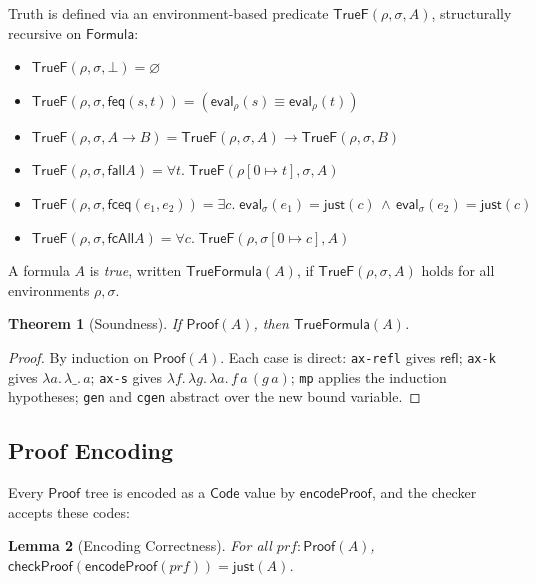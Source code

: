 \documentclass[11pt]{article}
\newtheorem{theorem}{Theorem}[section]
\newtheorem{lemma}[theorem]{Lemma}
\newcommand{\Code}{\mathsf{Code}}
\newcommand{\Formula}{\mathsf{Formula}}
\newcommand{\Proof}{\mathsf{Proof}}
\newcommand{\checkProof}{\mathsf{checkProof}}
\newcommand{\fbot}{\bot}
\newcommand{\feq}{\mathsf{feq}}
\newcommand{\fall}{\mathsf{fall}}
\newcommand{\fceq}{\mathsf{fceq}}
\newcommand{\fcAll}{\mathsf{fcAll}}
\newcommand{\TrueF}{\mathsf{TrueF}}
\newcommand{\TrueFormula}{\mathsf{TrueFormula}}
\begin{document}
Truth is defined via an environment-based predicate
$\TrueF(\rho, \sigma, A)$, structurally recursive on $\Formula$:
\begin{itemize}[nosep]
  \item $\TrueF(\rho, \sigma, \fbot) = \varnothing$
  \item $\TrueF(\rho, \sigma, \feq(s,t)) = (\mathsf{eval}_\rho(s) \equiv \mathsf{eval}_\rho(t))$
  \item $\TrueF(\rho, \sigma, A \to B) = \TrueF(\rho,\sigma,A) \to \TrueF(\rho,\sigma,B)$
  \item $\TrueF(\rho, \sigma, \fall A) = \forall t.\; \TrueF(\rho[0 \mapsto t], \sigma, A)$
  \item $\TrueF(\rho, \sigma, \fceq(e_1,e_2)) = \exists c.\; \mathsf{eval}_\sigma(e_1) = \mathsf{just}(c) \,\wedge\, \mathsf{eval}_\sigma(e_2) = \mathsf{just}(c)$
  \item $\TrueF(\rho, \sigma, \fcAll A) = \forall c.\; \TrueF(\rho, \sigma[0 \mapsto c], A)$
\end{itemize}
A formula $A$ is \emph{true}, written $\TrueFormula(A)$, if $\TrueF(\rho, \sigma, A)$
holds for all environments $\rho, \sigma$.

\begin{theorem}[Soundness]
  \label{thm:soundness}
  If $\Proof(A)$, then $\TrueFormula(A)$.
\end{theorem}

\begin{proof}
  By induction on $\Proof(A)$. Each case is direct:
  \texttt{ax-refl} gives $\mathsf{refl}$;
  \texttt{ax-k} gives $\lambda a.\, \lambda \_.\, a$;
  \texttt{ax-s} gives $\lambda f.\, \lambda g.\, \lambda a.\, f\,a\,(g\,a)$;
  \texttt{mp} applies the induction hypotheses;
  \texttt{gen} and \texttt{cgen} abstract over the new bound variable.
\end{proof}

\subsection{Proof Encoding}

Every $\Proof$ tree is encoded as a $\Code$ value by
$\mathsf{encodeProof}$, and the checker accepts these codes:

\begin{lemma}[Encoding Correctness]
  \label{lem:encode}
  For all $\mathit{prf} : \Proof(A)$,
  $\checkProof(\mathsf{encodeProof}(\mathit{prf})) = \mathsf{just}(A)$.
\end{lemma}
\end{document}
